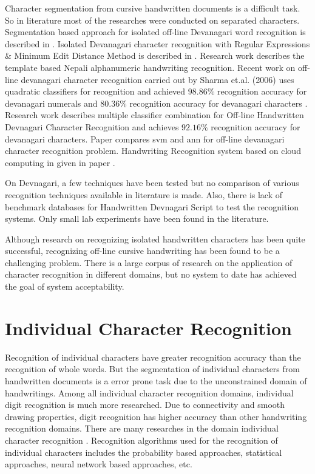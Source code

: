 Character segmentation from cursive handwritten documents is a difficult task. So in literature most of the researches were conducted on separated characters. Segmentation based approach for isolated off-line Devanagari word recognition is described in \cite{Shaw2008}. Isolated Devanagari character recognition with Regular Expressions \& Minimum Edit Distance Method is described in \cite{Sandhya2008}. Research work \cite{Santosh2007} describes the template based Nepali alphanumeric handwriting recognition. Recent work on off-line devanagari character recognition carried out by Sharma et.al. (2006) uses quadratic classifiers for recognition and achieved $98.86\%$ recognition accuracy for devanagari numerals and $80.36\%$ recognition accuracy for devanagari characters \cite{Sharma2006}. Research work \cite{Sandhya2010} describes multiple classifier combination for Off-line Handwritten Devnagari Character Recognition and achieves $92.16\%$ recognition accuracy for devanagari characters. Paper \cite{Sandhya2010_1} compares \ac{svm} and \ac{ann} for off-line devanagari character recognition problem. Handwriting Recognition system based on cloud computing in given in paper \cite{Yan2011}.

On Devnagari, a few techniques have been tested but no comparison of various recognition techniques available in literature is made. Also, there is lack of benchmark databases for Handwritten Devnagari Script to test the recognition systems. Only small lab experiments have been found in the literature.

Although research on recognizing isolated handwritten characters has been quite successful, recognizing off-line cursive handwriting has been found to be a challenging problem. There is a large corpus of research on the application of character recognition in different domains, but no system to date has achieved the goal of system acceptability.

\section{Individual Character Recognition}\label{section_individual_character_recognition}
Recognition of individual characters have greater recognition accuracy than the recognition of whole words. But the segmentation of individual characters from handwritten documents is a error prone task due to the unconstrained domain of handwritings. Among all individual character recognition domains, individual digit recognition is much more researched. Due to connectivity and smooth drawing properties, digit recognition has higher accuracy than other handwriting recognition domains. There are many researches in the domain individual character recognition \cite{Govindan1990,Kan2002,Bunke2003,Sharma2006,Santosh2007,Sandhya2008,Sabri2010,Sandhya2010,Sandhya2010_1,Ashok2011,Vikas2011,Yan2011,Srikrishna2011,Gaurav2012}. Recognition algorithms used for the recognition of individual characters includes the probability based approaches, statistical approaches, neural network based approaches, etc.


